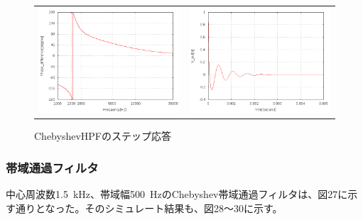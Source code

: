 \documentclass[10pt,a4j,dvipdfmx]{jsarticle}
\begin{document}
   \begin{figure}[H]
       \begin{tabular}{cc}
         \begin{minipage}[t]{0.45\hsize}
           \centering
           \includegraphics[width=8cm]{CHPF_Agraf.png}
           \caption{ChebyshevHPFの位相特性}
         \end{minipage} &
         \begin{minipage}[t]{0.45\hsize}
           \centering
           \includegraphics[width = 8cm]{CHPFstep.png}
           \caption{ChebyshevHPFのステップ応答}
         \end{minipage}
       \end{tabular}
     \end{figure}

 \subsubsection{帯域通過フィルタ}
 中心周波数\SI{1.5}{\kilo\hertz}、帯域幅\SI{500}{\hertz}のChebyshev帯域通過フィルタは、図27に示す通りとなった。そのシミュレート結果も、図28〜30に示す。
 
\end{document}
